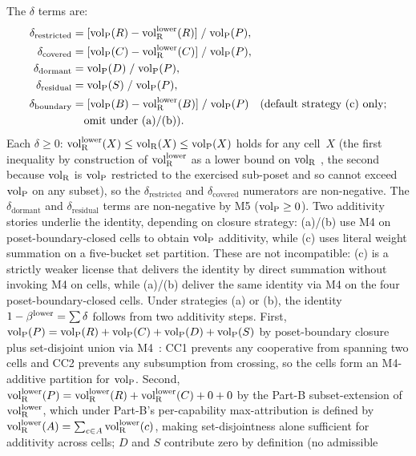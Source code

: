 \begin{definition}
The $\delta$ terms are:
\begin{align*}
  \delta_{\mathrm{restricted}} &= [\volL(R) -
    \volRlower(R)] \;/\; \volL(P), \\
  \delta_{\mathrm{covered}} &= [\volL(C) -
    \volRlower(C)] \;/\; \volL(P), \\
  \delta_{\mathrm{dormant}} &= \volL(D) \;/\; \volL(P), \\
  \delta_{\mathrm{residual}} &= \volL(S) \;/\; \volL(P), \\
  \delta_{\mathrm{boundary}} &= [\volL(B) -
    \volRlower(B)] \;/\; \volL(P)
    \quad \text{(default strategy~(c) only;}
    \\ &\hphantom{={}} \text{omit under~(a)/(b))}.
\end{align*}
Each $\delta \geq 0$: ${\operatorname{vol}_{\mathrm{R}}^{\mathrm{lower}}}(X) \leq {\operatorname{vol}_{\mathrm{R}}}(X) \leq
{\operatorname{vol}_{\mathrm{P}}}(X)$ holds for any cell~$X$ (the first inequality by
construction of ${\operatorname{vol}_{\mathrm{R}}^{\mathrm{lower}}}$ as a lower bound on ${\operatorname{vol}_{\mathrm{R}}}$
\citep[Revealed~Sacrifice]{lasser2026paper8a}, the second because ${\operatorname{vol}_{\mathrm{R}}}$ is
${\operatorname{vol}_{\mathrm{P}}}$ restricted to the exercised sub-poset and so cannot
exceed ${\operatorname{vol}_{\mathrm{P}}}$ on any subset), so the
$\delta_{\mathrm{restricted}}$ and $\delta_{\mathrm{covered}}$
numerators are non-negative.  The $\delta_{\mathrm{dormant}}$
and $\delta_{\mathrm{residual}}$ terms are non-negative by
M5 (${\operatorname{vol}_{\mathrm{P}}} \geq 0$).
Two additivity stories underlie the identity, depending on
closure strategy: (a)/(b) use M4 on poset-boundary-closed cells
to obtain ${\operatorname{vol}_{\mathrm{P}}}$ additivity, while (c) uses literal weight
summation on a five-bucket set partition.  These are not
incompatible: (c) is a strictly weaker license that delivers
the identity by direct summation without invoking M4 on
cells, while (a)/(b) deliver the same identity via M4 on the
four poset-boundary-closed cells.  Under strategies (a) or (b), the
identity $1 - \beta^{\mathrm{lower}} = \sum \delta$ follows from two additivity
steps.  First, ${\operatorname{vol}_{\mathrm{P}}}(P) = {\operatorname{vol}_{\mathrm{P}}}(R) + {\operatorname{vol}_{\mathrm{P}}}(C) + {\operatorname{vol}_{\mathrm{P}}}(D) +
{\operatorname{vol}_{\mathrm{P}}}(S)$ by poset-boundary closure plus set-disjoint union via
M4~\citep[Proposition~1]{lasser2026poset}: CC1 prevents any
cooperative from spanning two cells and CC2 prevents any
subsumption from crossing, so the cells form an M4-additive
partition for ${\operatorname{vol}_{\mathrm{P}}}$.  Second,
${\operatorname{vol}_{\mathrm{R}}^{\mathrm{lower}}}(P) = {\operatorname{vol}_{\mathrm{R}}^{\mathrm{lower}}}(R) + {\operatorname{vol}_{\mathrm{R}}^{\mathrm{lower}}}(C) + 0 + 0$ by
the Part-B subset-extension of ${\operatorname{vol}_{\mathrm{R}}^{\mathrm{lower}}}$, which under
Part-B's per-capability max-attribution
\citep[Revealed~Sacrifice]{lasser2026paper8a}
is defined by ${\operatorname{vol}_{\mathrm{R}}^{\mathrm{lower}}}(A) = \sum_{c \in A} {\operatorname{vol}_{\mathrm{R}}^{\mathrm{lower}}}(c)$,
making set-disjointness alone sufficient for additivity across
cells; $D$ and $S$ contribute zero by definition (no admissible

\end{definition}
